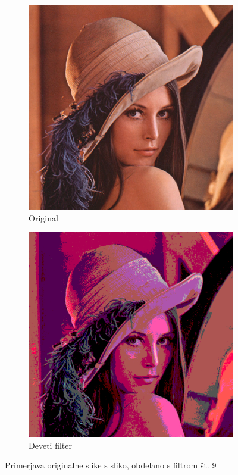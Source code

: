 \documentclass[a4paper, 12pt]{book}
\begin{document}
\begin{figure}[!ht]
    \centering
    \begin{subfigure}[b]{0.4\textwidth}
        \includegraphics[width=\textwidth]{lena}
        \caption{Original}
    \end{subfigure}
    \begin{subfigure}[b]{0.4\textwidth}
        \includegraphics[width=\textwidth]{lena_filter_9}
        \caption{Deveti filter}
    \end{subfigure}
    \caption{Primerjava originalne slike s sliko, obdelano s filtrom št. 9}
    \label{fig:lena_filter_9}
\end{figure}
\end{document}
